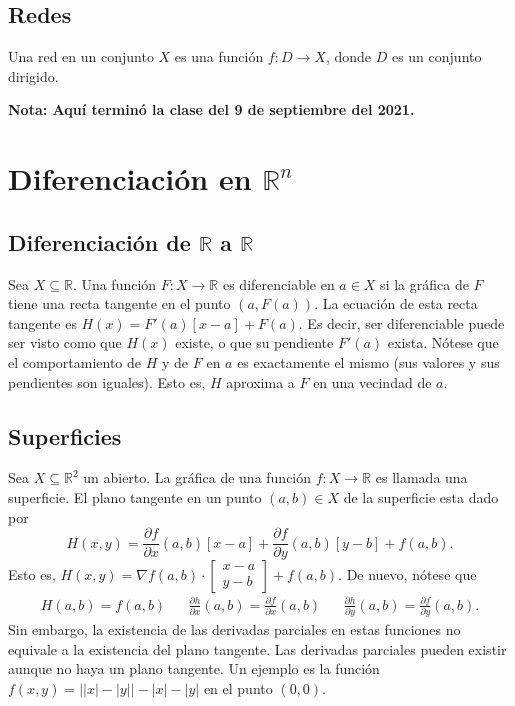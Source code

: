 \documentclass{article}
\begin{document}
\subsection*{Redes}

Una red en un conjunto $X$ es una función $f:D\to X$, donde $D$ es un conjunto dirigido.

\vspace{10pt}
\textbf{Nota: Aquí terminó la clase del 9 de septiembre del 2021.}
\newpage

\section*{Diferenciación en $\mathbb{R}^n$}

\subsection*{Diferenciación de $\mathbb{R}$ a $\mathbb{R}$}

Sea $X\subseteq\mathbb{R}$. Una función $F:X\to\mathbb{R}$ es diferenciable en $a\in X$ si la gráfica de $F$ tiene una recta tangente en el punto $(a,F(a))$. La ecuación de esta recta tangente es $H(x)=F'(a)[x-a]+F(a)$. Es decir, ser diferenciable puede ser visto como que $H(x)$ existe, o que su pendiente $F'(a)$ exista. Nótese que el comportamiento de $H$ y de $F$ en $a$ es exactamente el mismo (sus valores y sus pendientes son iguales). Esto es, $H$ aproxima a $F$ en una vecindad de $a$.

\subsection*{Superficies}

Sea $X\subseteq\mathbb{R}^2$ un abierto. La gráfica de una función $f:X\to\mathbb{R}$ es llamada una superficie. El plano tangente en un punto $(a,b)\in X$ de la superficie esta dado por
$$H(x,y)=\frac{\partial f}{\partial x}(a,b)[x-a]+\frac{\partial f}{\partial y}(a,b)[y-b]+f(a,b).$$
Esto es, $H(x,y)=\nabla f(a,b)\cdot\displaystyle\begin{bmatrix} x-a \\ y-b \end{bmatrix}+f(a,b)$. De nuevo, nótese que
\begin{align*}
H(a,b)=f(a,b) && \frac{\partial h}{\partial x}(a,b)=\frac{\partial f}{\partial x}(a,b) && \frac{\partial h}{\partial y}(a,b)=\frac{\partial f}{\partial y}(a,b).
\end{align*}
Sin embargo, la existencia de las derivadas parciales en estas funciones no equivale a la existencia del plano tangente. Las derivadas parciales pueden existir aunque no haya un plano tangente. Un ejemplo es la función $f(x,y)=\big||x|-|y|\big|-|x|-|y|$ en el punto $(0,0)$.
\end{document}

